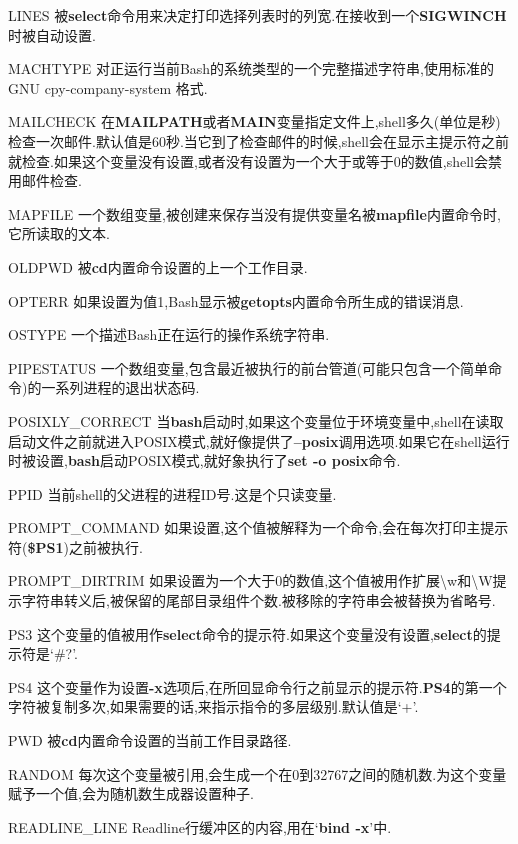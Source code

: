 \documentclass[draft,openany]{book}
\begin{document}
\begin{CJK}{UTF8}{gbsn}
\begin{basedescript}{\desclabelstyle{\nextlinelabel}\desclabelwidth{2.5em}}
    \item[LINES] 被\textbf{select}命令用来决定打印选择列表时的列宽.在接收到一个\textbf{SIGWINCH}时被自动设置.
    \item[MACHTYPE] 对正运行当前Bash的系统类型的一个完整描述字符串,使用标准的GNU cpy-company-system 格式.
    \item[MAILCHECK] 在\textbf{MAILPATH}或者\textbf{MAIN}变量指定文件上,shell多久(单位是秒)检查一次邮件.默认值是60秒.当它到了检查邮件的时候,shell会在显示主提示符之前就检查.如果这个变量没有设置,或者没有设置为一个大于或等于0的数值,shell会禁用邮件检查.
    \item[MAPFILE] 一个数组变量,被创建来保存当没有提供变量名被\textbf{mapfile}内置命令时,它所读取的文本.
    \item[OLDPWD] 被\textbf{cd}内置命令设置的上一个工作目录.
    \item[OPTERR] 如果设置为值1,Bash显示被\textbf{getopts}内置命令所生成的错误消息.
    \item[OSTYPE] 一个描述Bash正在运行的操作系统字符串.
    \item[PIPESTATUS] 一个数组变量,包含最近被执行的前台管道(可能只包含一个简单命令)的一系列进程的退出状态码.
    \item[POSIXLY\_CORRECT] 当\textbf{bash}启动时,如果这个变量位于环境变量中,shell在读取启动文件之前就进入POSIX模式,就好像提供了\textbf{--posix}调用选项.如果它在shell运行时被设置,\textbf{bash}启动POSIX模式,就好象执行了\textbf{set -o posix}命令.
    \item[PPID] 当前shell的父进程的进程ID号.这是个只读变量.
    \item[PROMPT\_COMMAND] 如果设置,这个值被解释为一个命令,会在每次打印主提示符(\textbf{\$PS1})之前被执行.
    \item[PROMPT\_DIRTRIM] 如果设置为一个大于0的数值,这个值被用作扩展\textbackslash{}w和\textbackslash{}W提示字符串转义后,被保留的尾部目录组件个数.被移除的字符串会被替换为省略号.
    \item[PS3] 这个变量的值被用作\textbf{select}命令的提示符.如果这个变量没有设置,\textbf{select}的提示符是`\#?'.
    \item[PS4] 这个变量作为设置\textbf{-x}选项后,在所回显命令行之前显示的提示符.\textbf{PS4}的第一个字符被复制多次,如果需要的话,来指示指令的多层级别.默认值是`+'.
    \item[PWD] 被\textbf{cd}内置命令设置的当前工作目录路径.
    \item[RANDOM] 每次这个变量被引用,会生成一个在0到32767之间的随机数.为这个变量赋予一个值,会为随机数生成器设置种子.
    \item[READLINE\_LINE] Readline行缓冲区的内容,用在`\textbf{bind -x}'中.

\end{basedescript}
\end{CJK}
\end{document}
